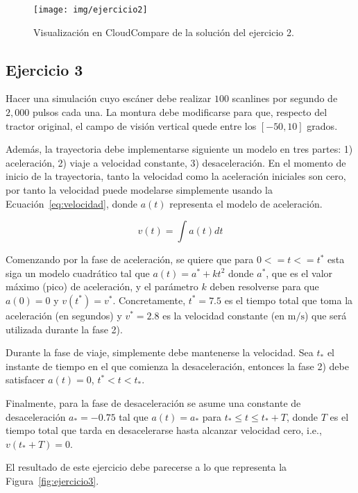 \documentclass[]{article}
\begin{document}
	\begin{figure}[htb]
		\centering
		\texttt{[image: img/ejercicio2]}
		\caption{Visualización en CloudCompare de la solución del ejercicio 2.}
		\label{fig:ejercicio2}
	\end{figure} 

	
	\pagebreak


	\subsection*{Ejercicio 3}
	Hacer una simulación cuyo escáner debe realizar $100$ scanlines por segundo de $2,000$ pulsos cada una. La montura debe modificarse para que, respecto del tractor original, el campo de visión vertical quede entre los $[-50, 10]$ grados.
	
	Además, la trayectoria debe implementarse siguiente un modelo en tres partes: 1) aceleración, 2) viaje a velocidad constante, 3) desaceleración. En el momento de inicio de la trayectoria, tanto la velocidad como la aceleración iniciales son cero, por tanto la velocidad puede modelarse simplemente usando la Ecuación~\ref{eq:velocidad}, donde $a(t)$ representa el modelo de aceleración.
	
	\begin{equation}
		v(t) = \int{a(t) dt}
	\label{eq:velocidad}
	\end{equation}
	
	Comenzando por la fase de aceleración, se quiere que para $0 <= t <= t^*$ esta siga un modelo cuadrático tal que \mbox{$a(t) = a^* + kt^2$} donde $a^*$, que es el valor máximo (pico) de aceleración, y el parámetro $k$ deben resolverse para que $a(0)=0$ y $v(t^*)=v^*$. Concretamente, $t^*=7.5$ es el tiempo total que toma la aceleración (en segundos) y $v^*=2.8$ es la velocidad constante (en $\mathrm{m}/\mathrm{s}$) que será utilizada durante la fase 2).
	
	Durante la fase de viaje, simplemente debe mantenerse la velocidad. Sea $t_*$ el instante de tiempo en el que comienza la desaceleración, entonces la fase 2) debe satisfacer $a(t) = 0$, $t^* < t < t_*$.
	
	Finalmente, para la fase de desaceleración se asume una constante de desaceleración $a_* = -0.75$ tal que $a(t) = a_*$ para $t_* \leq t \leq t_*+T$, donde $T$ es el tiempo total que tarda en desacelerarse hasta alcanzar velocidad cero, i.e., $v(t_*+T) = 0$.
	
	El resultado de este ejercicio debe parecerse a lo que representa la Figura~\ref{fig:ejercicio3}.
	
\end{document}
